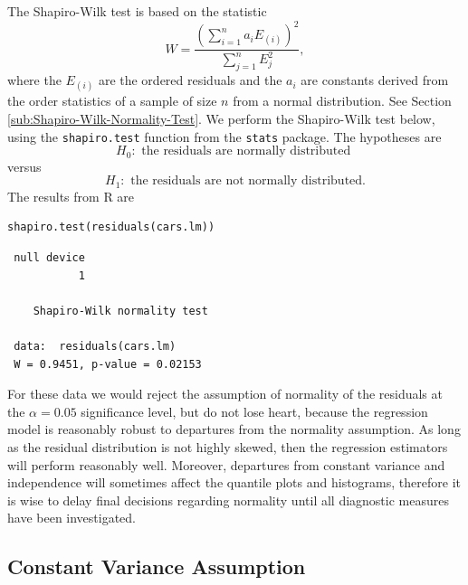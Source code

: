 \documentclass[captions=tableheading]{scrbook}
\begin{document}
The Shapiro-Wilk test is based on the statistic
\begin{equation}
W=\frac{\left(\sum_{i=1}^{n}a_{i}E_{(i)}\right)^{2}}{\sum_{j=1}^{n}E_{j}^{2}},
\end{equation}
where the \(E_{(i)}\) are the ordered residuals and the \(a_{i}\) are constants derived from the order statistics of a sample of size \(n\) from a normal distribution. See Section \ref{sub:Shapiro-Wilk-Normality-Test}.
We perform the Shapiro-Wilk test below, using the \texttt{shapiro.test} function from the \texttt{stats} package. The hypotheses are
\[
H_{0}:\mbox{ the residuals are normally distributed }
\]
versus
\[
H_{1}:\mbox{ the residuals are not normally distributed.}
\]
The results from \textsf{R} are


\begin{verbatim}
shapiro.test(residuals(cars.lm))
\end{verbatim}

\begin{verbatim}
 null device 
           1
  
 	Shapiro-Wilk normality test
 
 data:  residuals(cars.lm) 
 W = 0.9451, p-value = 0.02153
\end{verbatim}

For these data we would reject the assumption of normality of the residuals at the \(\alpha=0.05\) significance level, but do not lose heart, because the regression model is reasonably robust to departures from the normality assumption. As long as the residual distribution is not highly skewed, then the regression estimators will perform reasonably well. Moreover, departures from constant variance and independence will sometimes affect the quantile plots and histograms, therefore it is wise to delay final decisions regarding normality until all diagnostic measures have been investigated.
\subsection{Constant Variance Assumption}
\label{sec-11-4-2}

\label{sub:Constant-Variance-Assumption}
\end{document}
